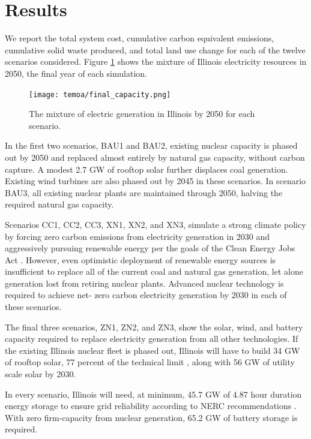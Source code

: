 \section{Results}

We report the total system cost, cumulative carbon equivalent emissions,
cumulative solid waste produced, and total land use change for each of the
twelve scenarios considered. Figure \ref{fig:cap-2050} shows the mixture of
Illinois electricity resources in 2050, the final year of each simulation.

\begin{figure}[H]
  \centering
  \texttt{[image: temoa/final\_capacity.png]}
  \caption{The mixture of electric generation in Illinois by 2050 for each scenario.}
  \label{fig:cap-2050}
\end{figure}

In the first two scenarios, BAU1 and BAU2, existing nuclear capacity is phased out
by 2050 and replaced almost entirely by natural gas capacity, without carbon
capture. A modest 2.7 GW of rooftop solar further displaces coal generation.
Existing wind turbines are also phased out by 2045 in these scenarios. In
scenario BAU3, all existing nuclear plants are maintained through 2050, halving
the required natural gas capacity.

Scenarios CC1, CC2, CC3, XN1, XN2, and XN3, simulate a strong climate policy by
forcing zero carbon emissions from electricity generation in 2030 and
aggressively pursuing renewable energy per the goals of the Clean Energy Jobs
Act \cite{illinois_clean_jobs_coalition_clean_2021}. However, even optimistic
deployment of renewable energy sources is insufficient to replace all of the
current coal and natural gas generation, let alone generation lost from
retiring nuclear plants. Advanced nuclear technology is required to achieve net-
zero carbon electricity generation by 2030 in each of these scenarios.

The final three scenarios, ZN1, ZN2, and ZN3, show the solar, wind, and battery
capacity required to replace electricity generation from all other technologies.
If the existing Illinois nuclear fleet is phased out, Illinois will have to
build 34 GW of rooftop solar, 77 percent of the technical limit \cite{gagnon_rooftop_2016}, along with 56 GW of utility scale solar by 2030.

In every scenario, Illinois will need, at minimum, 45.7 GW of 4.87 hour duration
energy storage to ensure grid reliability according to NERC recommendations
\cite{milligan_methods_2011}. With zero firm-capacity from nuclear
generation, 65.2 GW of battery storage is required.

